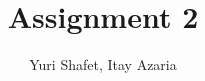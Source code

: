 \documentclass{report}
\begin{document}
\author{Yuri Shafet, Itay Azaria}
\title{Assignment 2}
\end{document}
